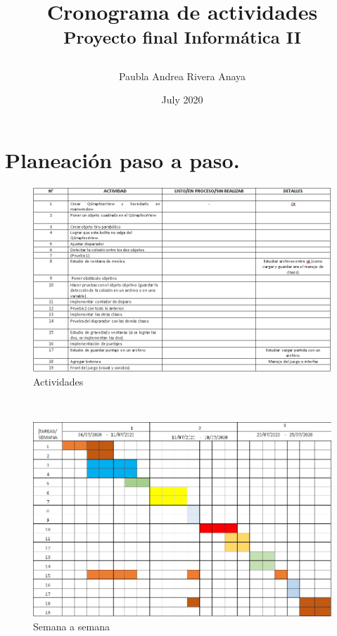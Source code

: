 \documentclass{article}
\title{Cronograma de actividades
\\
{\footnotesize\textsuperscript{Proyecto final Informática II}
}
}
\author{Paubla Andrea Rivera Anaya}
\date{July 2020}
\begin{document}
\maketitle

\section{Planeación paso a paso.}


\begin{figure}[h!]
\centering
\includegraphics[width=1.1\textwidth]{Fechas1.PNG}
\caption{\label{fig1}Actividades}
\end{figure}
\\

\begin{figure}[h!]
\centering
\includegraphics[width=1.1\textwidth]{prueba.png}
\caption{\label{fig1}Semana a semana}
\end{figure}
\\
\end{document}
